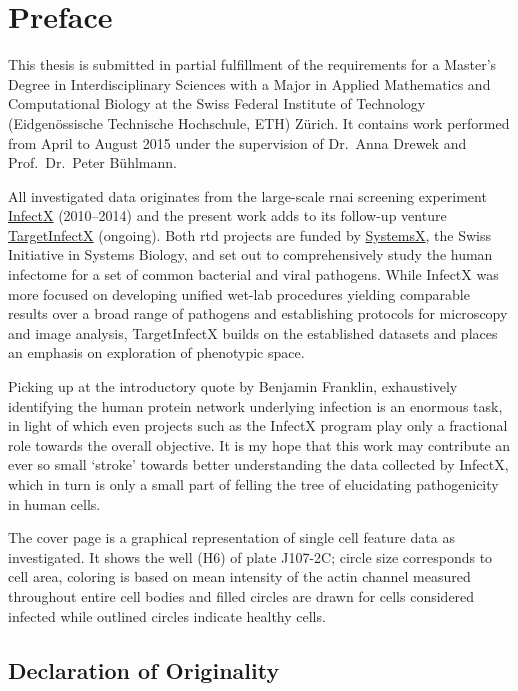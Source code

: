 \chapter{Preface}

This thesis is submitted in partial fulfillment of the requirements for a Master's Degree in Interdisciplinary Sciences with a Major in Applied Mathematics and Computational Biology at the Swiss Federal Institute of Technology (Eidgenössische Technische Hochschule, ETH) Z\"urich. It contains work performed from April to August 2015 under the supervision of Dr.\ Anna Drewek and Prof.\ Dr.\ Peter B\"uhlmann.

All investigated data originates from the large-scale \acrfull{rnai} screening experiment \href{http://www.infectx.ch}{InfectX} (2010--2014) and the present work adds to its follow-up venture \href{http://www.targetinfectx.ch}{TargetInfectX} (ongoing). Both \acrfull{rtd} projects are funded by \href{http://www.systemsx.ch}{SystemsX}, the Swiss Initiative in Systems Biology, and set out to comprehensively study the human infectome for a set of common bacterial and viral pathogens. While InfectX was more focused on developing unified wet-lab procedures yielding comparable results over a broad range of pathogens and establishing protocols for microscopy and image analysis, TargetInfectX builds on the established datasets and places an emphasis on exploration of phenotypic space.

Picking up at the introductory quote by Benjamin Franklin, exhaustively identifying the human protein network underlying infection is an enormous task, in light of which even projects such as the InfectX program play only a fractional role towards the overall objective. It is my hope that this work may contribute an ever so small `stroke' towards better understanding the data collected by InfectX, which in turn is only a small part of felling the tree of elucidating pathogenicity in human cells.

The cover page is a graphical representation of single cell feature data as investigated. It shows the  well (H6) of plate J107-2C; circle size corresponds to cell area, coloring is based on mean intensity of the actin channel measured throughout entire cell bodies and filled circles are drawn for cells considered infected while outlined circles indicate healthy cells.

\section*{Declaration of Originality}

